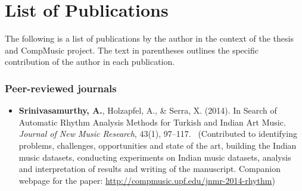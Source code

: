 \newcommand\contrib[1]{~{\footnotesize (#1)}}
% 
\newcommand\resource[2]{
\noindent #1 \par
\vspace{0.2em}
{\centering	\url{#2} \par}
\vspace{0.5em}
\hrule \par 
\vspace{0.8em} \par}
%
%
\chapter[List of Publications][List of Publications]{List of Publications}\label{app:mypapers}%
The following is a list of publications by the author in the context of the thesis and CompMusic project. The text in parentheses outlines the specific contribution of the author in each publication. 
\subsection*{Peer-reviewed journals}
\begin{itemize}[leftmargin=*]
	\item \textbf{Srinivasamurthy, A.}, Holzapfel, A., \& Serra, X. (2014). In Search of Automatic Rhythm Analysis Methods for Turkish and Indian Art Music. \textit{Journal of New Music Research}, 43(1), 97--117. \contrib{Contributed to identifying problems, challenges, opportunities and state of the art, building the Indian music datasets, conducting experiments on Indian music datasets, analysis and interpretation of results and writing of the manuscript. Companion webpage for the paper: \url{http://compmusic.upf.edu/jnmr-2014-rhythm}} %
\end{itemize}
%
